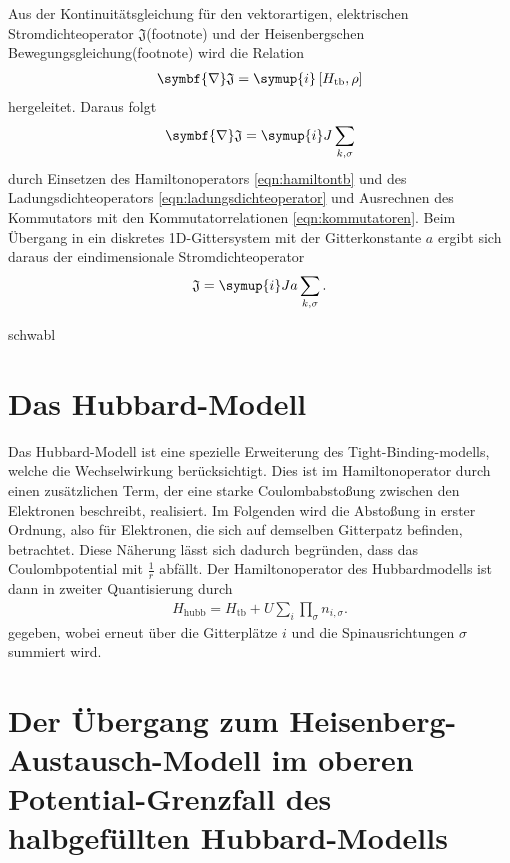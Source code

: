 Aus der Kontinuitätsgleichung für den vektorartigen, elektrischen Stromdichteoperator $\mathfrak{J}$(footnote) und der Heisenbergschen Bewegungsgleichung(footnote) wird die Relation
\begin{align}
  \symbf{\nabla}\mathfrak{J} = \symup{i} \left[H_\text{tb}, \rho \right]
\end{align}
hergeleitet. Daraus folgt
\begin{align}
  \symbf{\nabla}\mathfrak{J} = \symup{i} J \sum_{k,\sigma}
\end{align}
durch Einsetzen des Hamiltonoperators \eqref{eqn:hamiltontb} und des Ladungsdichteoperators \eqref{eqn:ladungsdichteoperator} und Ausrechnen des Kommutators mit den Kommutatorrelationen \eqref{eqn:kommutatoren}.
Beim Übergang in ein diskretes 1D-Gittersystem mit der Gitterkonstante $a$ ergibt sich daraus der eindimensionale Stromdichteoperator
\begin{align}
  \mathfrak{J} = \symup{i} J a \sum_{k,\sigma}.
\end{align}

schwabl

\section{Das Hubbard-Modell}

Das Hubbard-Modell ist eine spezielle Erweiterung des Tight-Binding-modells, welche die Wechselwirkung berücksichtigt.
Dies ist im Hamiltonoperator durch einen zusätzlichen Term, der eine starke Coulombabstoßung zwischen den Elektronen beschreibt, realisiert.
Im Folgenden wird die Abstoßung in erster Ordnung, also für Elektronen, die sich auf demselben Gitterpatz befinden, betrachtet.
Diese Näherung lässt sich dadurch begründen, dass das Coulombpotential mit $\frac1{r}$ abfällt. Der Hamiltonoperator des Hubbardmodells ist dann in zweiter Quantisierung durch
\begin{align}
  H_\text{hubb} = H_\text{tb} + U\sum_{i} \prod_{\sigma} n_{i,\sigma}.
  \label{eqn:hamiltonhubb}
\end{align}
gegeben, wobei erneut über die Gitterplätze $i$ und die Spinausrichtungen $\sigma$ summiert wird.

\section{Der Übergang zum Heisenberg-Austausch-Modell im oberen Potential-Grenzfall des halbgefüllten Hubbard-Modells}


